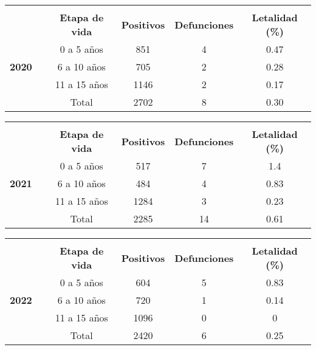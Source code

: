 \documentclass{article}
\begin{document}
\begin{table}
	\begin{tabular}{lccccc}
		\textbf{}  		 	   
		& \multicolumn{1}{l}{}  & \multicolumn{1}{l}{}   & \multicolumn{1}{l}{}   
		& \multicolumn{1}{l}{}  & \multicolumn{1}{l}{}	\\
		\textbf{}
		&\textbf{}			&\textbf{Etapa de vida} 
		&\textbf{Positivos} 	&\textbf{Defunciones}
		&\textbf{Letalidad (\%)} \\
		\textbf{}
		& 		&{ 0 a 5 años} 					&851 	&4 	&0.47 \\
		\textbf{2020}
		& 		&{6 a 10 años}					&705 	&2 	&0.28 \\
		\textbf{}
		& 		&{11 a 15 años}					&1146 	&2 	&0.17 \\
		\textbf{}
		& 		&\cellcolor{yellow}Total	&\cellcolor{yellow}2702 					  &\cellcolor{yellow}8 	&\cellcolor{yellow}0.30 	
	\end{tabular}
\end{table}

\begin{table}
	\begin{tabular}{lccccc}
		\textbf{}  		 	   
		& \multicolumn{1}{l}{}  & \multicolumn{1}{l}{}   & \multicolumn{1}{l}{}   
		& \multicolumn{1}{l}{}  & \multicolumn{1}{l}{}	\\
		\textbf{}
		&\textbf{}			&\textbf{Etapa de vida} 
		&\textbf{Positivos} 	&\textbf{Defunciones}
		&\textbf{Letalidad (\%)} \\
		\textbf{}
		& 		&{ 0 a 5 años} 					&517	&7 	&1.4 \\
		\textbf{2021}
		& 		&{6 a 10 años}					&484 	&4 	&0.83 \\
		\textbf{}
		& 		&{11 a 15 años}					&1284 	&3 	&0.23 \\
		\textbf{}
		& 		&\cellcolor{yellow}Total	&\cellcolor{yellow}2285 					  &\cellcolor{yellow}14 	&\cellcolor{yellow}0.61 	
	\end{tabular}
\end{table}

\begin{table}
	\begin{tabular}{lccccc}
		\textbf{}  		 	   
		& \multicolumn{1}{l}{}  & \multicolumn{1}{l}{}   & \multicolumn{1}{l}{}   
		& \multicolumn{1}{l}{}  & \multicolumn{1}{l}{}	\\
		\textbf{}
		&\textbf{}			&\textbf{Etapa de vida} 
		&\textbf{Positivos} 	&\textbf{Defunciones}
		&\textbf{Letalidad (\%)} \\
		\textbf{}
		& 		&{ 0 a 5 años} 					&604 	&5 	&0.83 \\
		\textbf{2022}
		& 		&{6 a 10 años}					&720 	&1 	&0.14 \\
		\textbf{}
		& 		&{11 a 15 años}					&1096 	&0 	&0 \\
		\textbf{}
		& 		&\cellcolor{yellow}Total	&\cellcolor{yellow}2420 					  &\cellcolor{yellow}6 	&\cellcolor{yellow}0.25 	
	\end{tabular}
\end{table}
\end{document}

